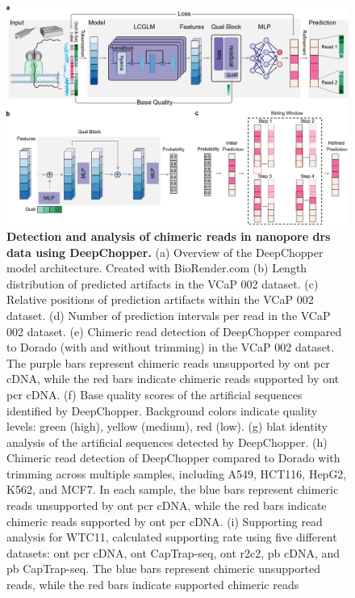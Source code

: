 \documentclass[pdflatex, sn-mathphys-num, lineno]{sn-jnl}%
\theoremstyle{thmstyleone}%
\theoremstyle{thmstyletwo}%
\theoremstyle{thmstylethree}%
\begin{document}
\begin{figure}[!h]
    \includegraphics[height=0.78\columnwidth]{figures/finals/figure1}
    \caption{{\bf  Detection and analysis of chimeric reads in nanopore \gls{drs} data using DeepChopper.} (a) Overview of the DeepChopper model architecture. Created with BioRender.com (b) Length distribution of predicted artifacts in the VCaP 002 dataset. (c)  Relative positions of prediction artifacts within the VCaP 002 dataset. (d) Number of prediction intervals per read in the VCaP 002 dataset. (e) Chimeric read detection of DeepChopper compared to Dorado (with and without trimming) in the VCaP 002 dataset. The purple bars represent chimeric reads unsupported by \gls{ont} \gls{pcr} cDNA, while the red bars indicate chimeric reads supported by \gls{ont} \gls{pcr} cDNA.  (f) Base quality scores of the artificial sequences identified by DeepChopper. Background colors indicate quality levels: green (high), yellow (medium), red (low). (g) \gls{blat} identity analysis of the artificial sequences detected by DeepChopper. (h) Chimeric read detection of DeepChopper compared to Dorado with trimming across multiple samples, including A549, HCT116, HepG2, K562, and MCF7. In each sample, the blue bars represent chimeric reads unsupported by \gls{ont} \gls{pcr} cDNA, while the red bars indicate chimeric reads supported by \gls{ont} \gls{pcr} cDNA. (i)  Supporting read analysis for WTC11, calculated supporting rate using five different datasets: \gls{ont} \gls{pcr} cDNA, \gls{ont} CapTrap-seq, \gls{ont} \gls{r2c2}, \gls{pb} cDNA, and \gls{pb} CapTrap-seq. The blue bars represent chimeric unsupported reads, while the red bars indicate supported chimeric reads}\label{fig:f1}
\end{figure}
\end{document}
